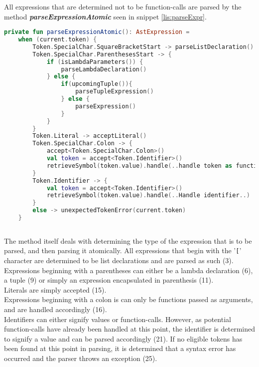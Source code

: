 All expressions that are determined not to be function-calls are parsed by the method \textbf{\textit{parseExpressionAtomic}} seen in snippet \ref{lis:parseExpr}.

\begin{lstlisting}[language=Kotlin,label=lis:parseExpr,caption=A simplified version of the parseExpressionAtomic method from the parser.]
private fun parseExpressionAtomic(): AstExpression =
    when (current.token) {
        Token.SpecialChar.SquareBracketStart -> parseListDeclaration()
        Token.SpecialChar.ParenthesesStart -> {
            if (isLambdaParameters()) {
                parseLambdaDeclaration()
            } else {
                if(upcomingTuple()){
                    parseTupleExpression()
                } else {
                    parseExpression()
                }
            }
        }
        Token.Literal -> acceptLiteral()
        Token.SpecialChar.Colon -> {
        	accept<Token.SpecialChar.Colon>()
        	val token = accept<Token.Identifier>()
        	retrieveSymbol(token.value).handle(..handle token as function..)
        }
        Token.Identifier -> {
            val token = accept<Token.Identifier>()
            retrieveSymbol(token.value).handle(..Handle identifier..)
        }
        else -> unexpectedTokenError(current.token)
    }
            
\end{lstlisting}

The method itself deals with determining the type of the expression that is to be parsed, and then parsing it atomically.
All expressions that begin with the '\texttt{[}' character are determined to be list declarations and are parsed as such (3).\\
Expressions beginning with a parentheses can either be a lambda declaration (6), a tuple (9) or simply an expression encapsulated in parenthesis (11).\\
Literals are simply accepted (15).\\
Expressions beginning with a colon is can only be functions passed as arguments, and are handled accordingly (16).\\
Identifiers can either signify values or function-calls.
However, as potential function-calls have already been handled at this point, the identifier is determined to signify a value and can be parsed accordingly (21).
If no eligible tokens has been found at this point in parsing, it is determined that a syntax error has occurred and the parser throws an exception (25).


